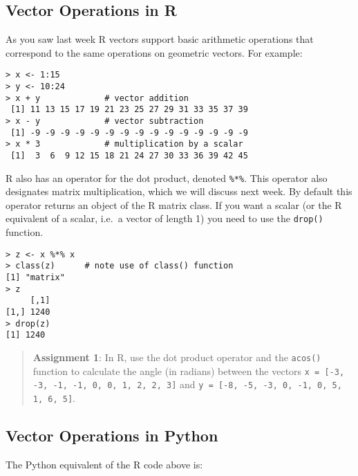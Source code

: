 

\subsection{Vector Operations in R}

As you saw last week R vectors support basic arithmetic operations that
correspond to the same operations on geometric vectors. For example:

\begin{lstlisting}
> x <- 1:15
> y <- 10:24
> x + y             # vector addition
 [1] 11 13 15 17 19 21 23 25 27 29 31 33 35 37 39
> x - y             # vector subtraction
 [1] -9 -9 -9 -9 -9 -9 -9 -9 -9 -9 -9 -9 -9 -9 -9
> x * 3             # multiplication by a scalar
 [1]  3  6  9 12 15 18 21 24 27 30 33 36 39 42 45 
\end{lstlisting}
R also has an operator for the dot product, denoted \lstinline!%*%!.
This operator also designates matrix multiplication, which we will
discuss next week. By default this operator returns an object of the R
matrix class. If you want a scalar (or the R equivalent of a scalar,
i.e.~a vector of length 1) you need to use the \lstinline!drop()!
function.

\begin{lstlisting}
> z <- x %*% x
> class(z)      # note use of class() function
[1] "matrix"
> z
     [,1]
[1,] 1240
> drop(z)
[1] 1240
\end{lstlisting}
\begin{quote}
\textbf{Assignment 1}: In R, use the dot product operator and the
\lstinline!acos()! function to calculate the angle (in radians) between
the vectors \lstinline!x = [-3, -3, -1, -1, 0, 0, 1, 2, 2, 3]! and
\lstinline!y = [-8, -5, -3, 0, -1, 0, 5, 1, 6, 5]!.

\end{quote}
\subsection{Vector Operations in Python}

The Python equivalent of the R code above is:

